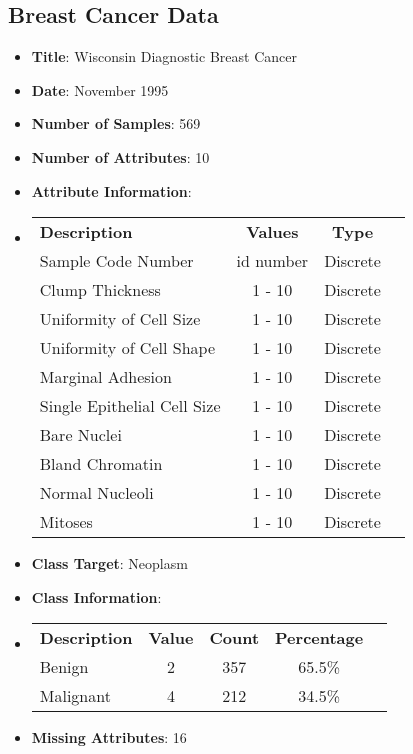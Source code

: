 \documentclass[11pt]{article}
\newcommand{\bb}{\textbf}
\begin{document}
\subsection{Breast Cancer Data}
\begin{itemize}[leftmargin=*]
  \item[] \bb{Title}: Wisconsin Diagnostic Breast Cancer
  \item[] \bb{Date}: November 1995
  \item[] \bb{Number of Samples}: 569
  \item[] \bb{Number of Attributes}: 10
  \item[] \bb{Attribute Information}:
  \item[]
  \begin{tabular}{l c c c }
    \bb{Description}             & \bb{Values} & \bb{Type} \\
    Sample Code Number           & id number   & Discrete  \\
    Clump Thickness              & 1 - 10      & Discrete  \\
    Uniformity of Cell Size      & 1 - 10      & Discrete  \\
    Uniformity of Cell Shape     & 1 - 10      & Discrete  \\
    Marginal Adhesion            & 1 - 10      & Discrete  \\
    Single Epithelial Cell Size  & 1 - 10      & Discrete  \\
    Bare Nuclei                  & 1 - 10      & Discrete  \\
    Bland Chromatin              & 1 - 10      & Discrete  \\
    Normal Nucleoli              & 1 - 10      & Discrete  \\
    Mitoses                      & 1 - 10      & Discrete
  \end{tabular}
  \item[] \bb{Class Target}: Neoplasm
  \item[] \bb{Class Information}:
  \item[]
  \begin{tabular}{l c c c c }
    \bb{Description} & \bb{Value} & \bb{Count} & \bb{Percentage} \\
    Benign           & 2          & 357        & 65.5\%          \\
    Malignant        & 4          & 212        & 34.5\%
  \end{tabular}
  \item[] \bb{Missing Attributes}: 16
\end{itemize}
\end{document}
